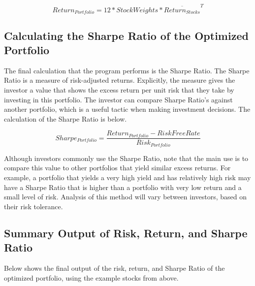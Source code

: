 \documentclass[12pt,english]{article}
\begin{document}
\begin{doublespace}
                \begin{center}
                    \begin{equation} \label{Portfolio Return}
                        Return_{Portfolio} = 
                        12 * StockWeights * \overline{Return_{Stocks}}^{T}
                    \end{equation}
                \end{center}
        
        \subsection{Calculating the Sharpe Ratio of the Optimized Portfolio}

            \indent{}\indent{}
            The final calculation that the program performs is the Sharpe Ratio. The Sharpe Ratio is a measure of risk-adjusted returns. Explicitly, the measure gives the investor a value that shows the excess return per unit risk that they take by investing in this portfolio. The investor can compare Sharpe Ratio’s against another portfolio, which is a useful tactic when making investment decisions. The calculation of the Sharpe Ratio is below.
            	
                \begin{center}
                    \begin{equation} \label{Sharpe Ratio}
                        Sharpe_{Portfolio} = 
                        \frac{Return_{Portfolio} - RiskFreeRate}{Risk_{Portfolio}} 
                    \end{equation}
                \end{center}
                
            \indent{}
            Although investors commonly use the Sharpe Ratio, note that the main use is to compare this value to other portfolios that yield similar excess returns. For example, a portfolio that yields a very high yield and has relatively high risk may have a Sharpe Ratio that is higher than a portfolio with very low return and a small level of risk. Analysis of this method will vary between investors, based on their risk tolerance.
            
        \subsection{Summary Output of Risk, Return, and Sharpe Ratio}
            \indent{}\indent{}
            Below shows the final output of the risk, return, and Sharpe Ratio of the optimized portfolio, using the example stocks from above.
            

\end{doublespace}
\end{document}
